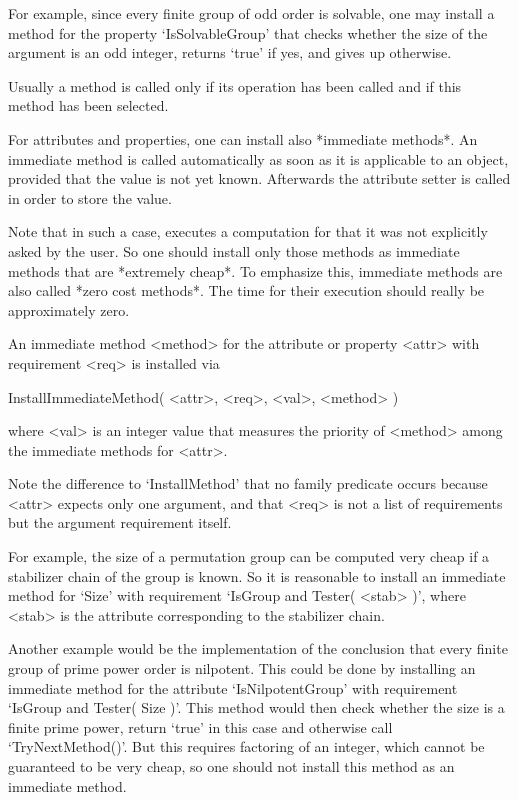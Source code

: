 For example, since every finite group of odd order is solvable,
one may install a method for the property `IsSolvableGroup' that checks
whether the size of the argument is an odd integer,
returns `true' if yes,
and gives up otherwise.


Usually a method is called only if its operation has been called
and if this method has been selected.

For attributes and properties, one can install also *immediate methods*.
An immediate method is called automatically as soon as it is applicable
to an object, provided that the value is not yet known.
Afterwards the attribute setter is called in order to store the value.

Note that in such a case, {\GAP} executes a computation for that
it was not explicitly asked by the user.
So one should install only those methods as immediate methods
that are *extremely cheap*.
To emphasize this, immediate methods are also called *zero cost methods*.
The time for their execution should really be approximately zero.

An immediate method <method> for the attribute or property <attr>
with requirement <req> is installed via

\>InstallImmediateMethod( <attr>, <req>, <val>, <method> )

where <val> is an integer value that measures the priority of <method>
among the immediate methods for <attr>.

Note the difference to `InstallMethod' that no family predicate occurs
because <attr> expects only one argument,
and that <req> is not a list of requirements but the argument requirement
itself.

For example, the size of a permutation group can be computed very cheap
if a stabilizer chain of the group is known.
So it is reasonable to install an immediate method for `Size' with
requirement `IsGroup and Tester( <stab> )',
where <stab> is the attribute corresponding to the stabilizer chain.

Another example would be the implementation of the conclusion that
every finite group of prime power order is nilpotent.
This could be done by installing an immediate method for the attribute
`IsNilpotentGroup' with requirement `IsGroup and Tester( Size )'.
This method would then check whether the size is a finite prime power,
return `true' in this case and otherwise call `TryNextMethod()'.
But this requires factoring of an integer,
which cannot be guaranteed to be very cheap,
so one should not install this method as an immediate method.

